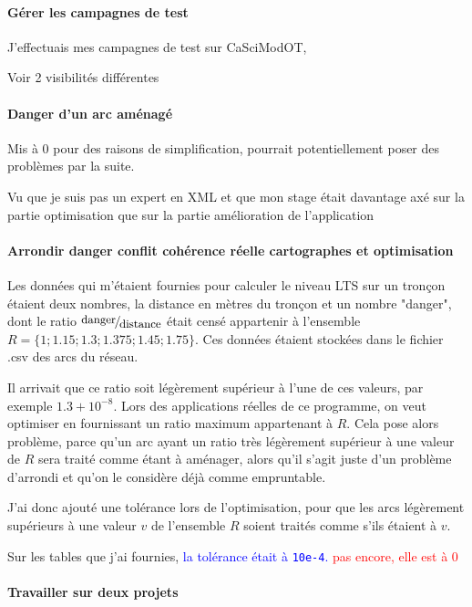 \paragraph{Gérer les campagnes de test}

J'effectuais mes campagnes de test sur CaSciModOT, 

Voir 2 visibilités différentes

\paragraph{Danger d'un arc aménagé}

Mis à 0 pour des raisons de simplification, pourrait potentiellement poser des problèmes par la suite.

Vu que je suis pas un expert en XML et que mon stage était davantage axé sur la partie optimisation que sur la partie amélioration de l'application  

\paragraph{Arrondir danger conflit cohérence réelle cartographes et optimisation}

Les données qui m'étaient fournies pour calculer le niveau LTS sur un tronçon étaient deux nombres, la distance en mètres du tronçon et un nombre "danger", dont le ratio $\fFrac{\text{danger}}{\text{distance}}$ était censé appartenir à l'ensemble $R=\{1; 1.15; 1.3; 1.375; 1.45; 1.75\}$. Ces données étaient stockées dans le fichier .csv des arcs du réseau.

Il arrivait que ce ratio soit légèrement supérieur à l'une de ces valeurs, par exemple $1.3+10^{-8}$. Lors des applications réelles de ce programme, on veut optimiser en fournissant un ratio maximum appartenant à $R$. Cela pose alors problème, parce qu'un arc ayant un ratio très légèrement supérieur à une valeur de $R$ sera traité comme étant à aménager, alors qu'il s'agit juste d'un problème d'arrondi et qu'on le considère déjà comme empruntable.

J'ai donc ajouté une tolérance lors de l'optimisation, pour que les arcs légèrement supérieurs à une valeur $v$ de l'ensemble $R$ soient traités comme s'ils étaient à $v$. 

Sur les tables que j'ai fournies, \textcolor{blue}{la tolérance était à \texttt{10e-4}.} \textcolor{red}{pas encore, elle est à 0}

\paragraph{Travailler sur deux projets}

